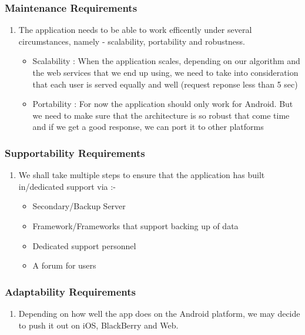 \documentclass[]{article}
\begin{document}
\subsubsection{Maintenance Requirements}
\label{ssub:maintenance_requirements}
\begin{enumerate}[{MS}1. ]
	\item The application needs to be able to work efficently under several circumstances, namely - scalability, portability and robustness.
		\begin{itemize}
		\item Scalability : When the application scales, depending on our algorithm and the web services that we end up using, we need to take into consideration that each user is served equally and well (request reponse less than 5 sec)
	    \item Portability : For now the application should only work for Android. But we need to make sure that the architecture is so robust that come time and if we get a good response, we can port it to other platforms
        \end{itemize}	    
\end{enumerate}

\subsubsection{Supportability Requirements}
\label{ssub:supportability_requirements}
\begin{enumerate}[{MS}2. ]
	\item We shall take multiple steps to ensure that the application has built in/dedicated support via :-
	    \begin{itemize}
	    \item Secondary/Backup Server
	    \item Framework/Frameworks that support backing up of data
	    \item Dedicated support personnel
	    \item A forum for users
	    \end{itemize}
\end{enumerate}

\subsubsection{Adaptability Requirements}
\label{ssub:adaptability_requirements}
\begin{enumerate}[{MS}3. ]
	\item Depending on how well the app does on the Android platform, we may decide to push it out on iOS, BlackBerry and Web.
\end{enumerate}
\end{document}
